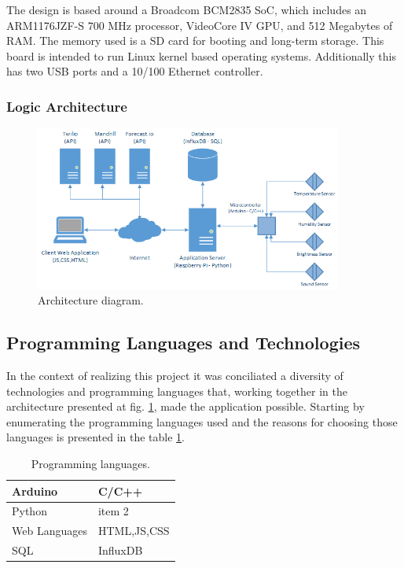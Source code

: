 \documentclass[12pt]{report}
\begin{document}
The design is based around a Broadcom BCM2835 SoC, which includes an ARM1176JZF-S 700 MHz processor, VideoCore IV GPU, and 512 Megabytes of RAM. The memory used is a SD card for booting and long-term storage. This board is intended to run Linux kernel based operating systems. Additionally this has two USB ports and a 10/100 Ethernet controller.

\subsubsection{Logic Architecture}

\begin{figure}[H]
    \centering
    \includegraphics[width=0.9\textwidth]{arc.png}
    \caption{Architecture diagram.}
    \label{fig:arc}
\end{figure}

\subsection{Programming Languages and Technologies}

In the context of realizing this project it was conciliated a diversity of technologies and programming languages that, working together in the architecture presented at fig. \ref{fig:arc}, made the application possible. Starting by enumerating the programming languages used and the reasons for choosing those languages is presented in the table \ref{tab:prolangs}.


\begin{table}[H]
\begin{tabularx}{0.8\textwidth}{ |l|X| }
  	\hline
  	Arduino  & C/C++  \\
 	\hline
 	Python  & item 2   \\
  	\hline
 	Web Languages  & HTML,JS,CSS   \\
	\hline
	SQL  & InfluxDB   \\
	\hline
\end{tabularx}
	\caption{Programming languages.}
  	\label{tab:prolangs}
\end{table}
\end{document}
